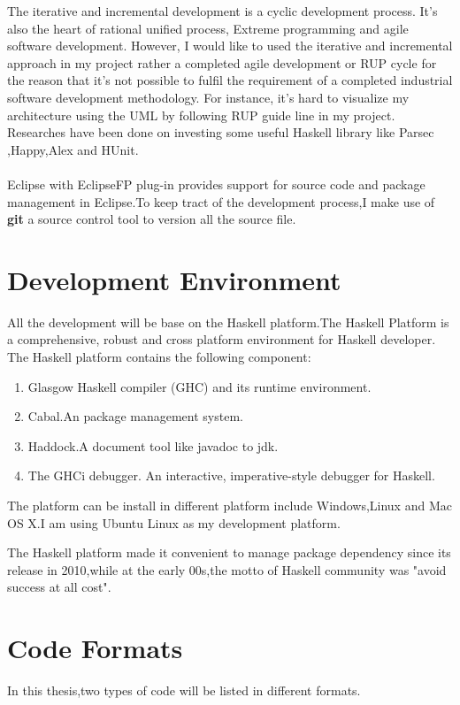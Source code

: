The iterative and incremental development is a cyclic development process.
It’s also the heart of rational unified process, Extreme programming and
agile software development. However, I would like to used the iterative and
incremental approach in my project rather a completed agile development or
RUP cycle for the reason that it’s not possible to fulfil the requirement of a
completed industrial software development methodology. For instance, it’s
hard to visualize my architecture using the UML by following RUP guide
line in my project.\\


Researches have been done on investing some useful Haskell library like Parsec ,Happy,Alex and HUnit.
\\
\\
Eclipse with EclipseFP plug-in provides support for source code and package management in Eclipse.To keep tract of the development process,I make use of \textbf{git} a source control tool to version all the source file.

\section{Development Environment}
All the development  will be base on the Haskell platform.The Haskell Platform is a comprehensive, robust and cross platform  environment for Haskell developer.
The Haskell platform contains the following component:
\begin{enumerate}
\item Glasgow Haskell compiler (GHC) and its runtime environment.
\item Cabal.An package management system.
\item Haddock.A document tool like javadoc to jdk.
\item The GHCi debugger.
An interactive, imperative-style debugger for Haskell.
\end{enumerate}
The platform can be install in different platform include Windows,Linux and Mac OS X.I am using Ubuntu Linux as my development platform.

The Haskell platform made it convenient to manage package dependency since its release in 2010,while at the early 00s,the motto of Haskell community was "avoid success at all cost"\cite{jones_wearing_2003}.


\section{Code Formats}
In this thesis,two types of code will be listed in different formats.

